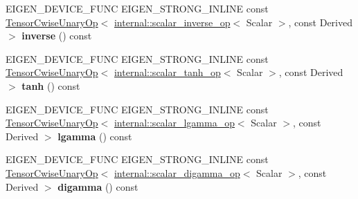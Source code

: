 \begin{DoxyCompactItemize}
\item 
\mbox{\label{class_eigen_1_1_tensor_base_3_01_derived_00_01_read_only_accessors_01_4_a6001679417b6e053206f7a92e91435bb}} 
E\+I\+G\+E\+N\+\_\+\+D\+E\+V\+I\+C\+E\+\_\+\+F\+U\+NC E\+I\+G\+E\+N\+\_\+\+S\+T\+R\+O\+N\+G\+\_\+\+I\+N\+L\+I\+NE const \hyperlink{class_eigen_1_1_tensor_cwise_unary_op}{Tensor\+Cwise\+Unary\+Op}$<$ \hyperlink{struct_eigen_1_1internal_1_1scalar__inverse__op}{internal\+::scalar\+\_\+inverse\+\_\+op}$<$ Scalar $>$, const Derived $>$ {\bfseries inverse} () const
\item 
\mbox{\label{class_eigen_1_1_tensor_base_3_01_derived_00_01_read_only_accessors_01_4_ad78e81fa292b9a37ad3fbef8fae10f6c}} 
E\+I\+G\+E\+N\+\_\+\+D\+E\+V\+I\+C\+E\+\_\+\+F\+U\+NC E\+I\+G\+E\+N\+\_\+\+S\+T\+R\+O\+N\+G\+\_\+\+I\+N\+L\+I\+NE const \hyperlink{class_eigen_1_1_tensor_cwise_unary_op}{Tensor\+Cwise\+Unary\+Op}$<$ \hyperlink{struct_eigen_1_1internal_1_1scalar__tanh__op}{internal\+::scalar\+\_\+tanh\+\_\+op}$<$ Scalar $>$, const Derived $>$ {\bfseries tanh} () const
\item 
\mbox{\label{class_eigen_1_1_tensor_base_3_01_derived_00_01_read_only_accessors_01_4_a4b00d02609dff99eee3608ff7b6dad5d}} 
E\+I\+G\+E\+N\+\_\+\+D\+E\+V\+I\+C\+E\+\_\+\+F\+U\+NC E\+I\+G\+E\+N\+\_\+\+S\+T\+R\+O\+N\+G\+\_\+\+I\+N\+L\+I\+NE const \hyperlink{class_eigen_1_1_tensor_cwise_unary_op}{Tensor\+Cwise\+Unary\+Op}$<$ \hyperlink{struct_eigen_1_1internal_1_1scalar__lgamma__op}{internal\+::scalar\+\_\+lgamma\+\_\+op}$<$ Scalar $>$, const Derived $>$ {\bfseries lgamma} () const
\item 
\mbox{\label{class_eigen_1_1_tensor_base_3_01_derived_00_01_read_only_accessors_01_4_a901513d85dd2da281bbb6f5f682e0b07}} 
E\+I\+G\+E\+N\+\_\+\+D\+E\+V\+I\+C\+E\+\_\+\+F\+U\+NC E\+I\+G\+E\+N\+\_\+\+S\+T\+R\+O\+N\+G\+\_\+\+I\+N\+L\+I\+NE const \hyperlink{class_eigen_1_1_tensor_cwise_unary_op}{Tensor\+Cwise\+Unary\+Op}$<$ \hyperlink{struct_eigen_1_1internal_1_1scalar__digamma__op}{internal\+::scalar\+\_\+digamma\+\_\+op}$<$ Scalar $>$, const Derived $>$ {\bfseries digamma} () const
\item 

\end{DoxyCompactItemize}
